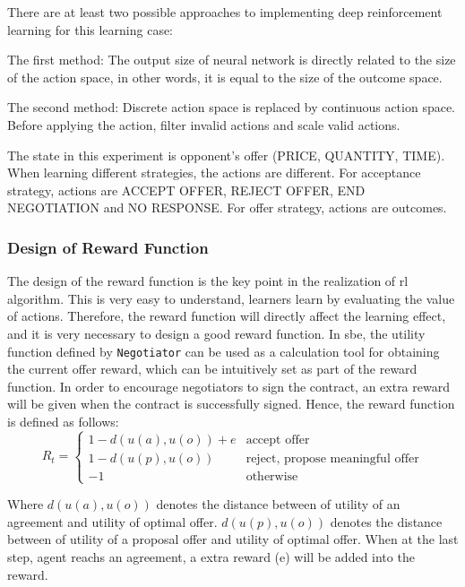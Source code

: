 There are at least two possible approaches to implementing deep reinforcement learning for this learning case:

The first method: The output size of neural network is directly related to the size of the action space, in other words, it is equal to the size of the outcome space. 

The second method: Discrete action space is replaced by continuous action space. Before applying the action, filter invalid actions and scale valid actions.

The state in this experiment is opponent's offer (PRICE, QUANTITY, TIME). When learning different strategies, the actions are different. For acceptance strategy, actions are ACCEPT OFFER, REJECT OFFER, END NEGOTIATION and NO RESPONSE. For offer strategy, actions are outcomes.

\subsubsection{Design of Reward Function}
The design of the reward function is the key point in the realization of \gls{rl} algorithm. This is very easy to understand, learners learn by evaluating the value of actions. Therefore, the reward function will directly affect the learning effect, and it is very necessary to design a good reward function. In \gls{sbe}, the utility function defined by \texttt{Negotiator} can be used as a calculation tool for obtaining the current offer reward, which can be intuitively set as part of the reward function. In order to encourage negotiators to sign the contract, an extra reward will be given when the contract is successfully signed. Hence, the reward function is defined as follows:
\begin{equation}
R_{t}=\left\{\begin{array}{ll}
1 - d(u(a), u(o)) + e & \text {accept offer}\\
1 - d(u(p), u(o))  & \text {reject, propose meaningful offer} \\
-1 & \text{otherwise}
\end{array}\right.
\end{equation}

Where $d(u(a), u(o))$ denotes the distance between of utility of an agreement and utility of optimal offer.  $d(u(p), u(o))$ denotes the distance between of utility of a proposal offer and utility of optimal offer. When at the last step, agent reachs an agreement, a extra reward (e) will be added into the reward.


